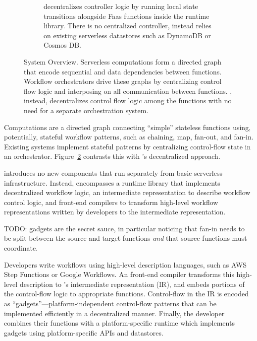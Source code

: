 \begin{figure}[t]
\begin{subfigure}[b]{\columnwidth}
        \caption{\name{} decentralizes controller logic by running local state
                 transitions alongside Faas functions inside the \name{} runtime
                library. There is no centralized controller, instead \name{} relies on existing
                serverless datastores such as DynamoDB or Cosmos DB.}
        \label{fig:arch:unum}
    \end{subfigure}
    \caption{\name{} System Overview. Serverless computations form a directed
            graph that encode sequential and data dependencies between functions. Workflow
            orchestrators drive these graphs by centralizing control flow logic and
            interposing on all communication between functions. \name{},
            instead, decentralizes control flow logic among the functions with
            no need for a separate orchestration system.}
    \label{fig:arch}
\end{figure}

Computations are a directed graph connecting ``simple'' stateless functions
using, potentially, stateful workflow patterns, such as chaining, map, fan-out,
and fan-in. Existing systems implement stateful patterns by centralizing
control-flow state in an orchestrator. Figure~\ref{fig:arch} contrasts this with
\name{}'s decentralized approach.

\name{} introduces no new components that run separately from basic serverless
infrastructure.  Instead, \name{} encompasses a runtime library that implements
decentralized workflow logic, an intermediate representation to describe
workflow control logic, and front-end compilers to transform high-level workflow
representations written by developers to the intermediate representation.

TODO: gadgets are the secret sauce, in particular noticing that fan-in needs to
be split between the source and target functions \emph{and} that source
functions must coordinate.

Developers write workflows using high-level description languages, such as AWS
Step Functions or Google Workflows. An \name{} front-end compiler transforms
this high-level description to \name{}'s intermediate representation (IR), and
embeds portions of the control-flow logic to appropriate functions. Control-flow
in the IR is encoded as ``gadgets''---platform-independent control-flow patterns
that can be implemented efficiently in a decentralized manner. Finally, the
developer combines their functions with a platform-specific \name{} runtime
which implements gadgets using platform-specific APIs and datastores.


